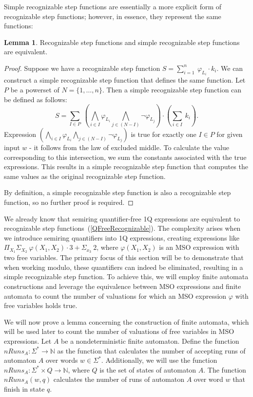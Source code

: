 \documentclass[12pt]{article}
\theoremstyle{definition}
\newtheorem{lemma}[theorem]{Lemma}
\begin{document}
Simple recognizable step functions are essentially a more explicit form of recognizable step functions; however, in essence, they represent the same functions:

\begin{lemma}
    \label{RecEqSimpleRec}
    Recognizable step functions and simple recognizable step functions are equivalent.
\end{lemma}

\begin{proof}
    Suppose we have a recognizable step function $S = \sum_{i = 1}^{n} \ \varphi_{L_i} \cdot k_i$. We can construct a simple recognizable step function that defines the same function. Let $P$ be a powerset of $N = \{1,\ldots,n\}$. Then a simple recognizable step function can be defined as follows:
    $$S = \sum_{I \in P} \ (\bigwedge_{i \in I} \varphi_{L_i} \bigwedge_{j \in (N-I)} \neg \varphi_{L_j}) \cdot (\sum_{i \in I} \ k_i).$$
    Expression $(\bigwedge_{i \in I} \varphi_{L_i} \bigwedge_{j \in (N-I)} \neg \varphi_{L_j})$ is true for exactly one $I \in P$ for given input $w$ - it follows from the law of excluded middle. To calculate the value corresponding to this intersection, we sum the constants associated with the true expressions. This results in a simple recognizable step function that computes the same values as the original recognizable step function.

    By definition, a simple recognizable step function is also a recognizable step function, so no further proof is required.
\end{proof}

We already know that semiring quantifier-free 1Q expressions are equivalent to recognizable step functions~(\cref{QFreeRecognizable}). The complexity arises when we introduce semiring quantifiers into 1Q expressions, creating expressions like $\Pi_{X_1} \Sigma_{X_2} \ \varphi(X_1, X_2) \cdot 3 + \Sigma_{x_3} \ 2$, where $\varphi(X_1, X_2)$ is an MSO expression with two free variables. The primary focus of this section will be to demonstrate that when working modulo, these quantifiers can indeed be eliminated, resulting in a simple recognizable step function. To achieve this, we will employ finite automata constructions and leverage the equivalence between MSO expressions and finite automata to count the number of valuations for which an MSO expression $\varphi$ with free variables holds true.

We will now prove a lemma concerning the construction of finite automata, which will be used later to count the number of valuations of free variables in MSO expressions. Let $A$ be a nondeterministic finite automaton. Define the function $nRuns_A : \Sigma^* \rightarrow \mathbb{N}$ as the function that calculates the number of accepting runs of automaton $A$ over words $w \in \Sigma^*$. Additionally, we will use the function $nRuns_A : \Sigma^* \times Q \rightarrow \mathbb{N}$, where $Q$ is the set of states of automaton $A$. The function $nRuns_A(w, q)$ calculates the number of runs of automaton $A$ over word $w$ that finish in state $q$.
\end{document}
